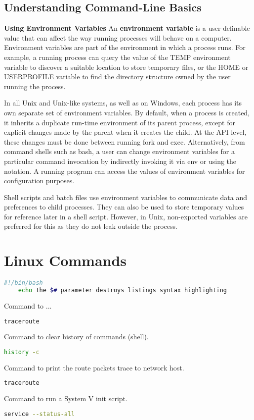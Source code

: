 \documentclass[a4paper]{article}
\begin{document}
\subsection{Understanding Command-Line Basics}
\textbf{Using Environment Variables}
	An \textbf{environment variable} is a user-definable value that can affect the way running processes will behave on a computer. Environment variables are part of the environment in which a process runs. For example, a running process can query the value of the TEMP environment variable to discover a suitable location to store temporary files, or the HOME or USERPROFILE variable to find the directory structure owned by the user running the process. 

	In all Unix and Unix-like systems, as well as on Windows, each process has its own separate set of environment variables. By default, when a process is created, it inherits a duplicate run-time environment of its parent process, except for explicit changes made by the parent when it creates the child. At the API level, these changes must be done between running fork and exec. Alternatively, from command shells such as bash, a user can change environment variables for a particular command invocation by indirectly invoking it via env or using the notation. A running program can access the values of environment variables for configuration purposes.

	Shell scripts and batch files use environment variables to communicate data and preferences to child processes. They can also be used to store temporary values for reference later in a shell script. However, in Unix, non-exported variables are preferred for this as they do not leak outside the process. 

\newpage
\section*{Linux Commands}
	\begin{lstlisting}[language=bash,caption={}]
	#!/bin/bash
	echo the $# parameter destroys listings syntax highlighting
	\end{lstlisting}


	Command to ...
	\begin{lstlisting}[language=bash,caption={}]
		traceroute
	\end{lstlisting}


	Command to clear history of commands (shell).
	\begin{lstlisting}[language=bash,caption={}]
		history -c
	\end{lstlisting}


	Command to print the route packets trace to network host.
	\begin{lstlisting}[language=bash,caption={}]
		traceroute
	\end{lstlisting}

	Command to run a System V init script.
	\begin{lstlisting}[language=bash,caption={}]
		service --status-all
	\end{lstlisting}
\end{document}
